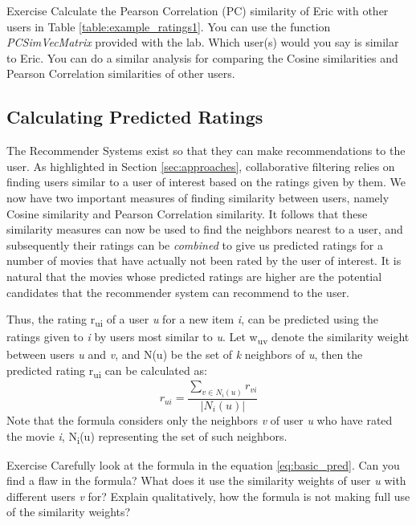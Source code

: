 \begin{myremark}{Exercise }
Calculate the Pearson Correlation (PC) similarity of Eric with other users in Table \ref{table:example_ratings1}. You can use the function \textit{PCSimVecMatrix} provided with the lab. Which user(s) would you say is similar to Eric. You can do a similar analysis for comparing the Cosine similarities and Pearson Correlation similarities of other users.
\end{myremark}

\subsection{Calculating Predicted Ratings}
The Recommender Systems exist so that they can make recommendations to the user. As highlighted in Section \ref{sec:approaches}, collaborative filtering relies on finding users similar to a user of interest based on the ratings given by them. We now have two important measures of finding similarity between users, namely Cosine similarity and Pearson Correlation similarity. It follows that these similarity measures can now be used to find the neighbors nearest to a user, and subsequently their ratings can be \textit{combined} to give us predicted ratings for a number of movies that have actually not been rated by the user of interest. It is natural that the movies whose predicted ratings are higher are the potential candidates that the recommender system can recommend to the user.

Thus, the rating r\textsubscript{ui} of a user \textit{u} for a new item \textit{i}, can be predicted using the ratings given to \textit{i} by users most similar to \textit{u}. Let w\textsubscript{uv} denote the similarity weight between users \textit{u} and \textit{v}, and N(u) be the set of \textit{k} neighbors of \textit{u}, then the predicted rating r\textsubscript{ui} can be calculated as:
\begin{equation} \label{eq:basic_pred}
r_{ui} = \frac
{\sum_{v \in{N_{i}(u)}}^{}{r_{vi}}}
{|N_{i}(u)|}
\end{equation}
Note that the formula considers only the neighbors \textit{v} of user \textit{u} who have rated the movie \textit{i}, N\textsubscript{i}(u) representing the set of such neighbors.

\begin{myremark}{Exercise }
Carefully look at the formula in the equation \ref{eq:basic_pred}. Can you find a flaw in the formula? What does it use the similarity weights of user \textit{u} with different users \textit{v} for? Explain qualitatively, how the formula is not making full use of the similarity weights?
\end{myremark}

